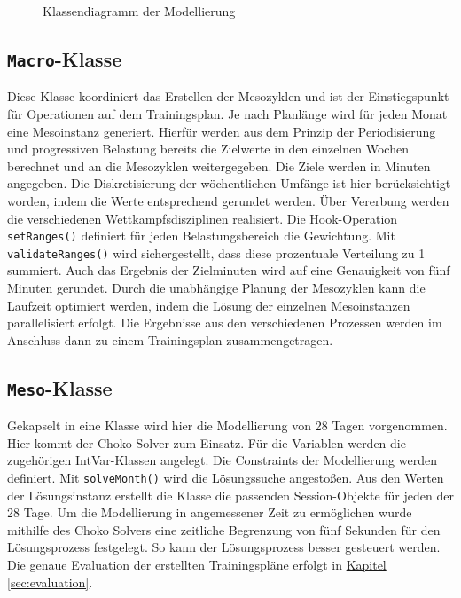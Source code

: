 \begin{figure}[h]
    \caption{Klassendiagramm der Modellierung}
    \label{fig:uml:solver}
\end{figure}

\subsection{\texttt{Macro}-Klasse}
Diese Klasse koordiniert das Erstellen der Mesozyklen und ist der Einstiegspunkt für Operationen auf dem Trainingsplan. Je nach Planlänge wird für jeden Monat eine Mesoinstanz generiert. Hierfür werden aus dem Prinzip der Periodisierung und progressiven Belastung bereits die Zielwerte in den einzelnen Wochen berechnet und an die Mesozyklen weitergegeben. Die Ziele werden in Minuten angegeben. Die Diskretisierung der wöchentlichen Umfänge ist hier berücksichtigt worden, indem die Werte entsprechend gerundet werden.\newline
Über Vererbung werden die verschiedenen Wettkampfsdisziplinen realisiert. Die Hook-Operation \texttt{setRanges()} definiert für jeden Belastungsbereich die Gewichtung. Mit \texttt{validateRanges()} wird sichergestellt, dass diese prozentuale Verteilung zu 1 summiert. Auch das Ergebnis der Zielminuten wird auf eine Genauigkeit von fünf Minuten gerundet.
Durch die unabhängige Planung der Mesozyklen kann die Laufzeit optimiert werden, indem die Lösung der einzelnen Mesoinstanzen parallelisiert erfolgt. Die Ergebnisse aus den verschiedenen Prozessen werden im Anschluss dann zu einem Trainingsplan zusammengetragen. 

\subsection{\texttt{Meso}-Klasse}

Gekapselt in eine Klasse wird hier die Modellierung von 28 Tagen vorgenommen. Hier kommt der Choko Solver zum Einsatz. Für die Variablen werden die zugehörigen IntVar-Klassen angelegt. Die Constraints der Modellierung werden definiert. Mit \texttt{solveMonth()} wird die Lösungssuche angestoßen.
Aus den Werten der Lösungsinstanz erstellt die Klasse die passenden Session-Objekte für jeden der 28 Tage.
Um die Modellierung in angemessener Zeit zu ermöglichen wurde mithilfe des Choko Solvers eine zeitliche Begrenzung von fünf Sekunden für den Lösungsprozess festgelegt. So kann der Lösungsprozess besser gesteuert werden. Die genaue Evaluation der erstellten Trainingspläne erfolgt in \hyperref[sec:evaluation]{Kapitel \ref{sec:evaluation}}.

